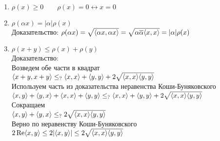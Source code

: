 \begin{enumerate}
\item $\rho(x) \geq 0 \qquad \rho(x) = 0 \leftrightarrow x = 0$
\item $\rho(\alpha x) = |\alpha| \rho(x)$\\
Доказательство: $\rho(\alpha x) = \sqrt{\langle \alpha x, \alpha x \rangle} = \sqrt{\alpha \overline{\alpha} \langle x,x \rangle} = |\alpha| \rho(x)$
\item $\rho(x+y) \leq \rho(x) + \rho(y)$\\
Доказательство:\\
Возведем обе части в квадрат\\
$\langle x+y,x+y \rangle \leq_? \langle x,x \rangle + \langle y,y \rangle + 2\sqrt{\langle x,x \rangle\langle y,y \rangle}$\\
Используем часть из доказательства неравенства Коши-Буняковского\\
$\langle x,y \rangle + \langle y,x \rangle + \langle x,x \rangle + \langle y,y \rangle \leq_? \langle x,x \rangle + \langle y,y \rangle + 2\sqrt{\langle x,x \rangle\langle y,y \rangle}$\\
Сокращаем\\
$\langle x,y \rangle + \langle y,x \rangle \leq_? 2\sqrt{\langle x,x \rangle\langle y,y \rangle}$\\
Верно по неравенству Коши-Буняковского\\
$2\operatorname{Re}\langle x,y \rangle \leq 2 |\langle x,y \rangle|  \leq 2\sqrt{\langle x,x \rangle\langle y,y \rangle}$
\end{enumerate}


\newpage

